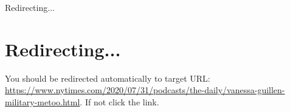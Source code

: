 Redirecting...

\hypertarget{redirecting}{%
\section{Redirecting...}\label{redirecting}}

You should be redirected automatically to target URL:
\url{https://www.nytimes.com/2020/07/31/podcasts/the-daily/vanessa-guillen-military-metoo.html}.
If not click the link.
